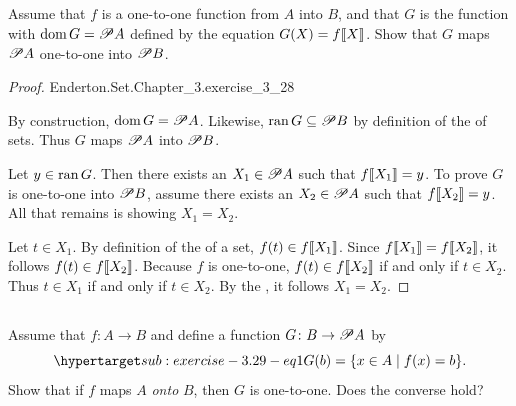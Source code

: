 \documentclass{report}
\begin{document}
\subsection{}%

Assume that $f$ is a one-to-one function from $A$ into $B$, and that $G$ is the
  function with $\mathop{\text{dom}}{G} = \mathscr{P}A$ defined by the equation
  $G(X) = f\!\left\llbracket X\right\rrbracket$.
Show that $G$ maps $\mathscr{P}A$ one-to-one into $\mathscr{P}B$.

\begin{proof}

    {Enderton.Set.Chapter\_3.exercise\_3\_28}

  By construction, $\mathop{\text{dom}}{G} = \mathscr{P}A$.
  Likewise, $\mathop{\text{ran}}{G} \subseteq \mathscr{P}B$ by definition of the
     of sets.
  Thus $G$ maps $\mathscr{P}A$ into $\mathscr{P}B$.

  Let $y \in \mathop{\text{ran}}{G}$.
  Then there exists an $X_1 \in \mathscr{P}A$ such that $f\!\left\llbracket X_1\right\rrbracket = y$.
  To prove $G$ is one-to-one into $\mathscr{P}B$, assume there exists an
    $X_2 \in \mathscr{P}A$ such that $f\!\left\llbracket X_2\right\rrbracket = y$.
  All that remains is showing $X_1 = X_2$.

  Let $t \in X_1$.
  By definition of the  of a set, $f(t) \in f\!\left\llbracket X_1\right\rrbracket$.
  Since $f\!\left\llbracket X_1\right\rrbracket = f\!\left\llbracket X_2\right\rrbracket$, it follows $f(t) \in f\!\left\llbracket X_2\right\rrbracket$.
  Because $f$ is one-to-one, $f(t) \in f\!\left\llbracket X_2\right\rrbracket$ if and only if $t \in X_2$.
  Thus $t \in X_1$ if and only if $t \in X_2$.
  By the , it follows $X_1 = X_2$.

\end{proof}

\subsection{}%

Assume that $f \colon A \rightarrow B$ and define a function
  $G \colon B \rightarrow \mathscr{P}A$ by
  \begin{equation}
    \hyperlabel{sub:exercise-3.29-eq1}
    G(b) = \{x \in A \mid f(x) = b\}.
  \end{equation}
Show that if $f$ maps $A$ \textit{onto} $B$, then $G$ is one-to-one.
Does the converse hold?
\end{document}

